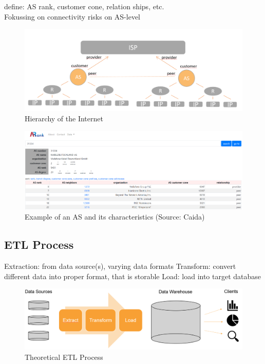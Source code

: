 \documentclass[conference]{IEEEtran}
\begin{document}
define: AS rank, customer cone, relation ships, etc. \\


Fokussing on connectivity risks on AS-level 






\begin{figure}[htbp]
\centerline{\includegraphics[scale=0.25]{Graphics/hierarchy.PNG}}
\caption{Hierarchy of the Internet}
\label{fig}
\end{figure}

\begin{figure}[htbp]
\centerline{\includegraphics[scale=0.15]{Graphics/asExample.PNG}}
\caption{Example of an AS and its characteristics (Source: Caida)}
\label{fig}
\end{figure}



\subsection{ETL Process}

Extraction: from data source(s), varying data formats
Transform: convert different data into proper format, that is storable
Load: load into target database




\begin{figure}[htbp]
\centerline{\includegraphics[scale=0.3]{Graphics/ETLTheory.PNG}}
\caption{Theoretical ETL Process}
\label{fig}
\end{figure}
\end{document}
